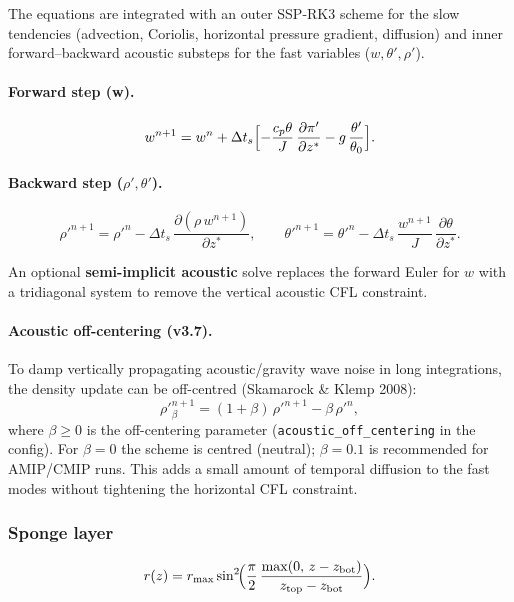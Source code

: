 \documentclass[11pt,a4paper]{article}
\newcommand{\pp}{\partial}
\newcommand{\cpd}{c_p}
\begin{document}
The equations are integrated with an outer SSP-RK3 scheme for the slow tendencies (advection, Coriolis, horizontal pressure gradient, diffusion) and inner forward--backward acoustic substeps for the fast variables ($w,\theta',\rho'$).

\paragraph{Forward step (w).}
\begin{equation}
  w^{n+1} = w^n + \Delta t_s\Bigl[-\frac{\cpd\theta}{J}\,\frac{\pp\pi'}{\pp z^*} - g\,\frac{\theta'}{\theta_0}\Bigr].
\end{equation}

\paragraph{Backward step ($\rho',\theta'$).}
\begin{equation}
  \rho'^{n+1} = \rho'^n - \Delta t_s\,\frac{\pp(\rho\,w^{n+1})}{\pp z^*},
  \qquad
  \theta'^{n+1} = \theta'^n - \Delta t_s\,\frac{w^{n+1}}{J}\,\frac{\pp\theta}{\pp z^*}.
\end{equation}

An optional \textbf{semi-implicit acoustic} solve replaces the forward Euler for $w$ with a tridiagonal system to remove the vertical acoustic CFL constraint.

\paragraph{Acoustic off-centering (v3.7).}
To damp vertically propagating acoustic/gravity wave noise in long integrations, the density update can be off-centred (Skamarock \& Klemp 2008):
\begin{equation}
  \rho'^{n+1}_{\beta} = (1+\beta)\,\rho'^{n+1} - \beta\,\rho'^{n},
\end{equation}
where $\beta\ge 0$ is the off-centering parameter (\texttt{acoustic\_off\_centering} in the config).  For $\beta=0$ the scheme is centred (neutral); $\beta=0.1$ is recommended for AMIP/CMIP runs.  This adds a small amount of temporal diffusion to the fast modes without tightening the horizontal CFL constraint.

\subsubsection{Sponge layer}
\begin{equation}
  r(z) = r_{\max}\sin^2\!\Bigl(\frac{\pi}{2}\,\frac{\max(0,\,z-z_{\mathrm{bot}})}{z_{\mathrm{top}}-z_{\mathrm{bot}}}\Bigr).
\end{equation}
\end{document}
